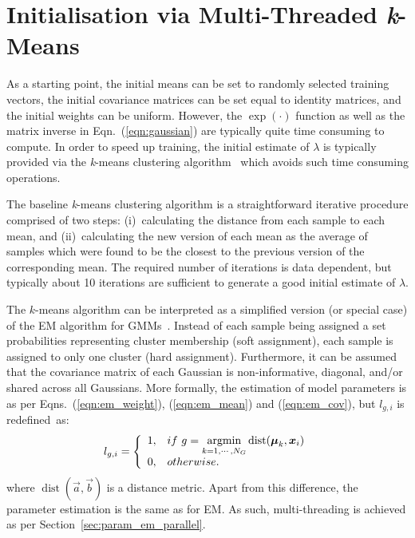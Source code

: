 \section{Initialisation via Multi-Threaded {\it k}-Means}
\label{sec:param_km}

As a starting point, the initial means can be set to randomly selected training vectors,
the initial covariance matrices can be set equal to identity matrices, 
and the initial weights can be uniform.
However, the $\exp(\cdot)$ function as well as the matrix inverse in Eqn.~(\ref{eqn:gaussian}) are typically quite time consuming to compute.
In order to speed up training, the initial estimate of $\lambda$ is typically provided via the {\it k}-means clustering algorithm~\cite{Bishop_2006,Duda01,Kulis_2012}
which avoids such time consuming operations.

The baseline {\it k}-means clustering algorithm is a straightforward iterative procedure comprised of two steps:
(i)~calculating the distance from each sample to each mean,
and
(ii)~calculating the new version of each mean as the average of samples which were found to be the closest to the previous version of the corresponding mean.
The required number of iterations is data dependent,
but typically about 10 iterations are sufficient to generate a good initial estimate of $\lambda$.

The $k$-means algorithm can be interpreted as a simplified version (or special case) of the EM algorithm for GMMs~\cite{Kulis_2012}.
Instead of each sample being assigned a set probabilities representing cluster membership (soft assignment),
each sample is assigned to only one cluster (hard assignment).
Furthermore, it can be assumed that the covariance matrix of each Gaussian is non-informative, diagonal, and/or shared across all Gaussians.
More formally, the estimation of model parameters is as per Eqns.~(\ref{eqn:em_weight}), (\ref{eqn:em_mean}) and (\ref{eqn:em_cov}), 
but $l_{g,i}$ is redefined~as:%
%
\begin{equation}
  l_{g,i} = \left\{
  \begin{array}{ll}
  1, & \mbox{if} ~ g = \argmin\limits_{k=1, \cdots, N_G} \operatorname{dist}(\Vec{\mu}_k, \Vec{x}_i) \\
  0, & \mbox{otherwise}.
  \end{array}
  \right.
  \label{eqn:binary_likelihood}
\end{equation}
%
where {$\operatorname{dist}(\Vec{a}, \Vec{b})$} is a distance metric.
Apart from this difference, the parameter estimation is the same as for EM.
As such, multi-threading is achieved as per Section~\ref{sec:param_em_parallel}.

